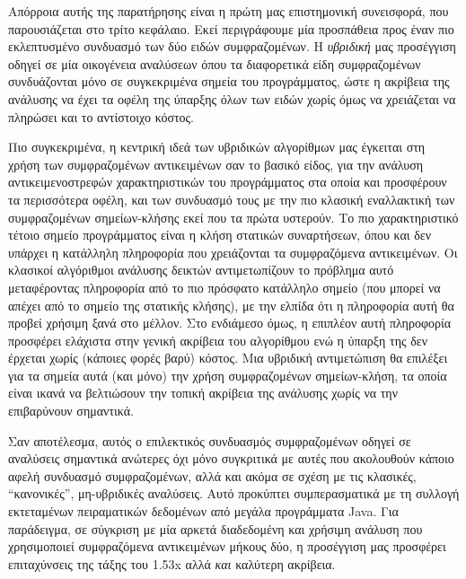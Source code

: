 Απόρροια αυτής της παρατήρησης είναι η πρώτη μας επιστημονική συνεισφορά, που παρουσιάζεται στο τρίτο κεφάλαιο. Εκεί περιγράφουμε μία προσπάθεια προς έναν πιο εκλεπτυσμένο συνδυασμό των δύο ειδών συμφραζομένων. Η \emph{υβριδική} μας προσέγγιση οδηγεί σε μία οικογένεια αναλύσεων όπου τα διαφορετικά είδη συμφραζομένων συνδυάζονται μόνο σε συγκεκριμένα σημεία του προγράμματος, ώστε η ακρίβεια της ανάλυσης να έχει τα οφέλη της ύπαρξης όλων των ειδών χωρίς όμως να χρειάζεται να πληρώσει και το αντίστοιχο κόστος.

Πιο συγκεκριμένα, η κεντρική ιδεά των υβριδικών αλγορίθμων μας έγκειται στη χρήση των συμφραζομένων αντικειμένων σαν το βασικό είδος, για την ανάλυση αντικειμενοστρεφών χαρακτηριστικών του προγράμματος στα οποία και προσφέρουν τα περισσότερα οφέλη, και των συνδυασμό τους με την πιο κλασική εναλλακτική των συμφραζομένων σημείων-κλήσης εκεί που τα πρώτα υστερούν. Το πιο χαρακτηριστικό τέτοιο σημείο προγράμματος είναι η κλήση στατικών συναρτήσεων, όπου και δεν υπάρχει η κατάλληλη πληροφορία που χρειάζονται τα συμφραζόμενα αντικειμένων. Οι κλασικοί αλγόριθμοι ανάλυσης δεικτών αντιμετωπίζουν το πρόβλημα αυτό μεταφέροντας πληροφορία από το πιο πρόσφατο κατάλληλο σημείο (που μπορεί να απέχει από το σημείο της στατικής κλήσης), με την ελπίδα ότι η πληροφορία αυτή θα προβεί χρήσιμη ξανά στο μέλλον. Στο ενδιάμεσο όμως, η επιπλέον αυτή πληροφορία προσφέρει ελάχιστα στην γενική ακρίβεια του αλγορίθμου ενώ η ύπαρξη της δεν έρχεται χωρίς (κάποιες φορές βαρύ) κόστος. Μια υβριδική αντιμετώπιση θα επιλέξει για τα σημεία αυτά (και μόνο) την χρήση συμφραζομένων σημείων-κλήση, τα οποία είναι ικανά να βελτιώσουν την τοπική ακρίβεια της ανάλυσης χωρίς να την επιβαρύνουν σημαντικά.

Σαν αποτέλεσμα, αυτός ο επιλεκτικός συνδυασμός συμφραζομένων οδηγεί σε αναλύσεις σημαντικά ανώτερες όχι μόνο συγκριτικά με αυτές που ακολουθούν κάποιο αφελή συνδυασμό συμφραζομένων, αλλά και ακόμα σε σχέση με τις κλασικές, ``κανονικές'', μη-υβριδικές αναλύσεις. Αυτό προκύπτει συμπερασματικά με τη συλλογή εκτεταμένων πειραματικών δεδομένων από μεγάλα προγράμματα {\en Java}. Για παράδειγμα, σε σύγκριση με μία αρκετά διαδεδομένη και χρήσιμη ανάλυση που χρησιμοποιεί συμφραζόμενα αντικειμένων μήκους δύο, η προσέγγιση μας προσφέρει επιταχύνσεις της τάξης του {\en 1.53x} αλλά \emph{και} καλύτερη ακρίβεια.